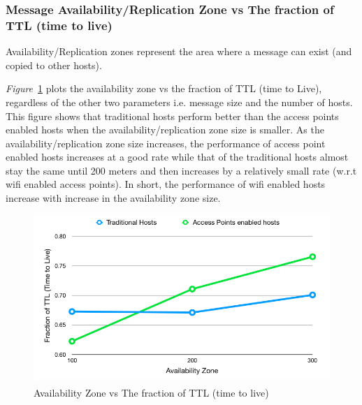\subsubsection{Message Availability/Replication Zone vs The fraction of TTL (time to live)}
Availability/Replication zones represent the area where a message can exist (and copied to other hosts). {\emph{Figure}~\ref{fig:scenario1_availability_zone} plots the availability zone vs the fraction of TTL (time to Live), regardless of the other two parameters i.e. message size and the number of hosts. This figure shows that traditional hosts perform better than the access points enabled hosts when the availability/replication zone size is smaller. As the availability/replication zone size increases, the performance of access point enabled hosts increases at a good rate while that of the traditional hosts almost stay the same until 200 meters and then increases by a relatively small rate (w.r.t wifi enabled access points). In short, the performance of wifi enabled hosts increase with increase in the availability zone size.
\begin{figure}[H]
  \centering
  \includegraphics[scale=0.45]{./figures/scenario1_availability_zone}
  \caption{Availability Zone vs The fraction of TTL (time to live)}
  \label{fig:scenario1_availability_zone}
\end{figure}
}
